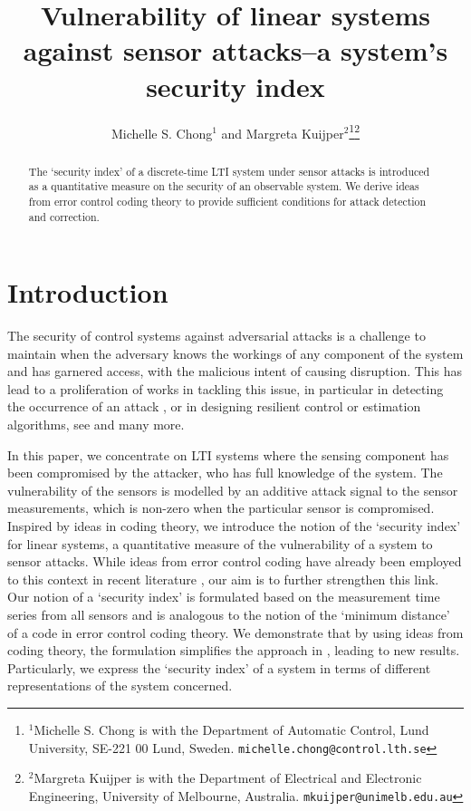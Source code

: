 \documentclass[letterpaper, 10 pt, conference]{ieeeconf}
\title{\LARGE \bf
Vulnerability of linear systems against sensor attacks--a system's security index
}
\author{Michelle S. Chong$^{1}$ and Margreta Kuijper$^{2}$\thanks{$^{1}$Michelle S. Chong is with the Department of Automatic Control, Lund University, SE-221 00 Lund, Sweden.
        {\tt\small michelle.chong@control.lth.se}}\thanks{$^{2}$Margreta Kuijper is with the Department of Electrical and Electronic Engineering, University of Melbourne, Australia.
        {\tt\small mkuijper@unimelb.edu.au}}}
\begin{document}
\maketitle
\thispagestyle{empty}
\pagestyle{empty}


\begin{abstract}
The `security index' of a discrete-time LTI system under sensor attacks is introduced as a quantitative measure on the security of an observable system. We derive ideas from error control coding theory to provide sufficient conditions for attack detection and correction. 
\end{abstract}


\section{Introduction}
The security of control systems against adversarial attacks is a challenge to maintain when the adversary knows the workings of any component of the system and has garnered access, with the malicious intent of causing disruption. This has lead to a proliferation of works in tackling this issue, in particular in detecting the occurrence of an attack \cite{pasqualetti2013attack, pasqualetti2012attack, pasqualetti2015divide}, or in designing resilient control or estimation algorithms, see \cite{fawziTD14, shoukry2013event, ChongWakaikiHespanhaACC15, chenKarMouraICASSP15, sandbergTJ2010} and many more.

In this paper, we concentrate on LTI systems where the sensing component has been compromised by the attacker, who has full knowledge of the system. The vulnerability of the sensors is modelled by an additive attack signal to the sensor measurements, which is non-zero when the particular sensor is compromised. Inspired by ideas in coding theory, we introduce the notion of the `security index' for linear systems, a quantitative measure of the vulnerability of a system to sensor attacks. While ideas from error control coding have already been employed to this context in recent literature \cite{fawziTD14}, our aim is to further strengthen this link. Our notion of a `security index' is formulated based on the measurement time series from all sensors and is analogous to the notion of the `minimum distance' of a code in error control coding theory. We demonstrate that by using ideas from coding theory, the formulation simplifies the approach in \cite{fawziTD14}, leading to new results. Particularly, we express the `security index' of a system in terms of different representations of the system concerned. 
 
\end{document}

